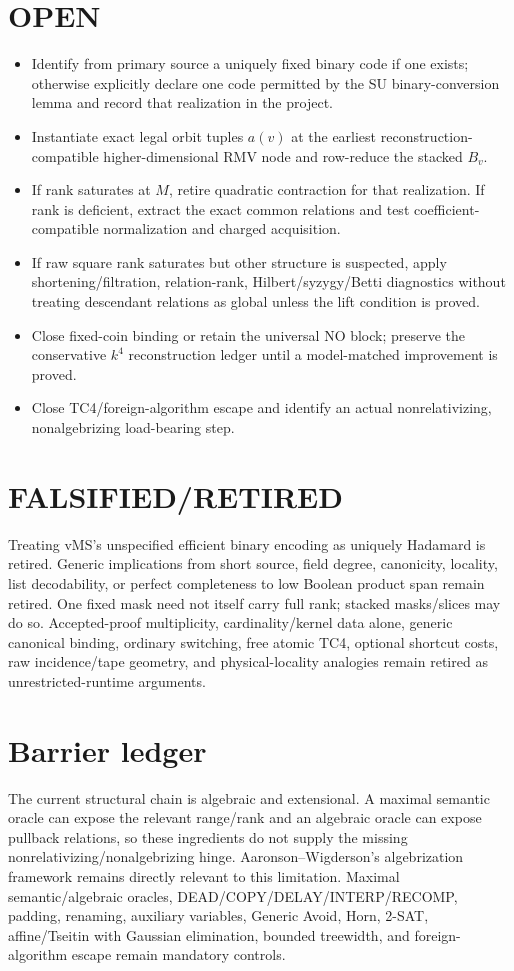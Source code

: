 \documentclass[11pt]{article}
\begin{document}
\section*{OPEN}
\begin{itemize}
\item Identify from primary source a uniquely fixed binary code if one exists; otherwise explicitly declare one code permitted by the SU binary-conversion lemma and record that realization in the project.
\item Instantiate exact legal orbit tuples \(a(v)\) at the earliest reconstruction-compatible higher-dimensional RMV node and row-reduce the stacked \(B_v\).
\item If rank saturates at \(M\), retire quadratic contraction for that realization. If rank is deficient, extract the exact common relations and test coefficient-compatible normalization and charged acquisition.
\item If raw square rank saturates but other structure is suspected, apply shortening/filtration, relation-rank, Hilbert/syzygy/Betti diagnostics without treating descendant relations as global unless the lift condition is proved.
\item Close fixed-coin binding or retain the universal NO block; preserve the conservative \(k^4\) reconstruction ledger until a model-matched improvement is proved.
\item Close TC4/foreign-algorithm escape and identify an actual nonrelativizing, nonalgebrizing load-bearing step.
\end{itemize}

\section*{FALSIFIED/RETIRED}
Treating vMS's unspecified efficient binary encoding as uniquely Hadamard is retired. Generic implications from short source, field degree, canonicity, locality, list decodability, or perfect completeness to low Boolean product span remain retired. One fixed mask need not itself carry full rank; stacked masks/slices may do so. Accepted-proof multiplicity, cardinality/kernel data alone, generic canonical binding, ordinary switching, free atomic TC4, optional shortcut costs, raw incidence/tape geometry, and physical-locality analogies remain retired as unrestricted-runtime arguments.

\section*{Barrier ledger}
The current structural chain is algebraic and extensional. A maximal semantic oracle can expose the relevant range/rank and an algebraic oracle can expose pullback relations, so these ingredients do not supply the missing nonrelativizing/nonalgebrizing hinge. Aaronson--Wigderson's algebrization framework remains directly relevant to this limitation. Maximal semantic/algebraic oracles, DEAD/COPY/DELAY/INTERP/RECOMP, padding, renaming, auxiliary variables, Generic Avoid, Horn, 2-SAT, affine/Tseitin with Gaussian elimination, bounded treewidth, and foreign-algorithm escape remain mandatory controls.
\end{document}
